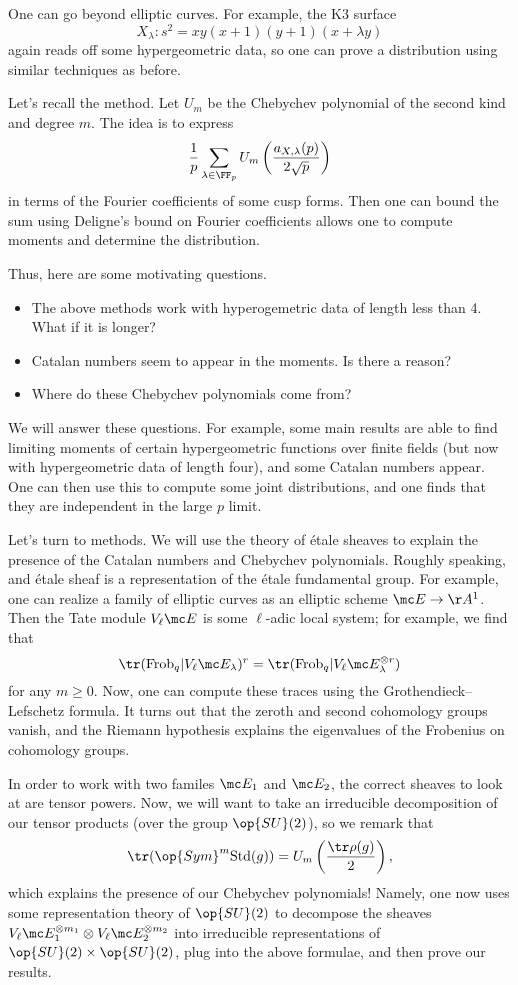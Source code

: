 \documentclass{article}
\begin{document}
One can go beyond elliptic curves. For example, the K3 surface
\[X_\lambda\colon s^2=xy(x+1)(y+1)(x+\lambda y)\]
again reads off some hypergeometric data, so one can prove a distribution using similar techniques as before.

Let's recall the method. Let $U_m$ be the Chebychev polynomial of the second kind and degree $m$. The idea is to express
\[\frac1p\sum_{\lambda\in\FF_p}U_m\left(\frac{a_{X,\lambda}(p)}{2\sqrt p}\right)\]
in terms of the Fourier coefficients of some cusp forms. Then one can bound the sum using Deligne's bound on Fourier coefficients allows one to compute moments and determine the distribution.

Thus, here are some motivating questions.
\begin{itemize}
	\item The above methods work with hyperogemetric data of length less than 4. What if it is longer?
	\item Catalan numbers seem to appear in the moments. Is there a reason?
	\item Where do these Chebychev polynomials come from?
\end{itemize}
We will answer these questions. For example, some main results are able to find limiting moments of certain hypergeometric functions over finite fields (but now with hypergeometric data of length four), and some Catalan numbers appear. One can then use this to compute some joint distributions, and one finds that they are independent in the large $p$ limit.

Let's turn to methods. We will use the theory of \'etale sheaves to explain the presence of the Catalan numbers and Chebychev polynomials. Roughly speaking, and \'etale sheaf is a representation of the \'etale fundamental group. For example, one can realize a family of elliptic curves as an elliptic scheme $\mc E\to\AA^1$. Then the Tate module $V_\ell\mc E$ is some $\ell$-adic local system; for example, we find that
\[\tr(\mathrm{Frob}_q\vert V_\ell\mc E_\lambda)^r=\tr(\mathrm{Frob}_q\vert V_\ell\mc E_\lambda^{\otimes r})\]
for any $m\ge0$. Now, one can compute these traces using the Grothendieck--Lefschetz formula. It turns out that the zeroth and second cohomology groups vanish, and the Riemann hypothesis explains the eigenvalues of the Frobenius on cohomology groups.

In order to work with two familes $\mc E_1$ and $\mc E_2$, the correct sheaves to look at are tensor powers. Now, we will want to take an irreducible decomposition of our tensor products (over the group $\op{SU}(2)$), so we remark that
\[\tr(\op{Sym}^m\mathrm{Std}(g))=U_m\left(\frac{\tr\rho(g)}2\right),\]
which explains the presence of our Chebychev polynomials! Namely, one now uses some representation theory of $\op{SU}(2)$ to decompose the sheaves $V_\ell\mc E_1^{\otimes m_1}\otimes V_\ell\mc E_2^{\otimes m_2}$ into irreducible representations of $\op{SU}(2)\times\op{SU}(2)$, plug into the above formulae, and then prove our results.
\end{document}
